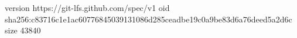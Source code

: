 version https://git-lfs.github.com/spec/v1
oid sha256:c83716c1e1ac60776845039131086d285ceadbe19c0a9be83d6a76deed5a2d6c
size 43840
